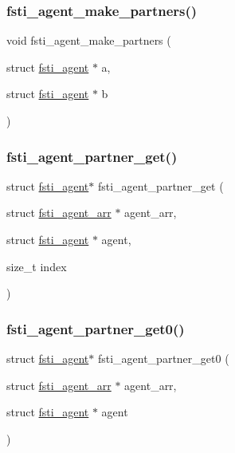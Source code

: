 \subsubsection{\texorpdfstring{fsti\+\_\+agent\+\_\+make\+\_\+partners()}{fsti\_agent\_make\_partners()}}
{\footnotesize\ttfamily void fsti\+\_\+agent\+\_\+make\+\_\+partners (\begin{DoxyParamCaption}\item[{struct \mbox{\hyperlink{structfsti__agent}{fsti\+\_\+agent}} $\ast$}]{a,  }\item[{struct \mbox{\hyperlink{structfsti__agent}{fsti\+\_\+agent}} $\ast$}]{b }\end{DoxyParamCaption})}

\mbox{\label{fsti-agent_8c_a8ea9850f51ba1cc3f842f3730cf22139}} 
\subsubsection{\texorpdfstring{fsti\+\_\+agent\+\_\+partner\+\_\+get()}{fsti\_agent\_partner\_get()}}
{\footnotesize\ttfamily struct \mbox{\hyperlink{structfsti__agent}{fsti\+\_\+agent}}$\ast$ fsti\+\_\+agent\+\_\+partner\+\_\+get (\begin{DoxyParamCaption}\item[{struct \mbox{\hyperlink{structfsti__agent__arr}{fsti\+\_\+agent\+\_\+arr}} $\ast$}]{agent\+\_\+arr,  }\item[{struct \mbox{\hyperlink{structfsti__agent}{fsti\+\_\+agent}} $\ast$}]{agent,  }\item[{size\+\_\+t}]{index }\end{DoxyParamCaption})}

\mbox{\label{fsti-agent_8c_abe4c0c13ceb1a50eb8d9223a7122f269}} 
\subsubsection{\texorpdfstring{fsti\+\_\+agent\+\_\+partner\+\_\+get0()}{fsti\_agent\_partner\_get0()}}
{\footnotesize\ttfamily struct \mbox{\hyperlink{structfsti__agent}{fsti\+\_\+agent}}$\ast$ fsti\+\_\+agent\+\_\+partner\+\_\+get0 (\begin{DoxyParamCaption}\item[{struct \mbox{\hyperlink{structfsti__agent__arr}{fsti\+\_\+agent\+\_\+arr}} $\ast$}]{agent\+\_\+arr,  }\item[{struct \mbox{\hyperlink{structfsti__agent}{fsti\+\_\+agent}} $\ast$}]{agent }\end{DoxyParamCaption})}

